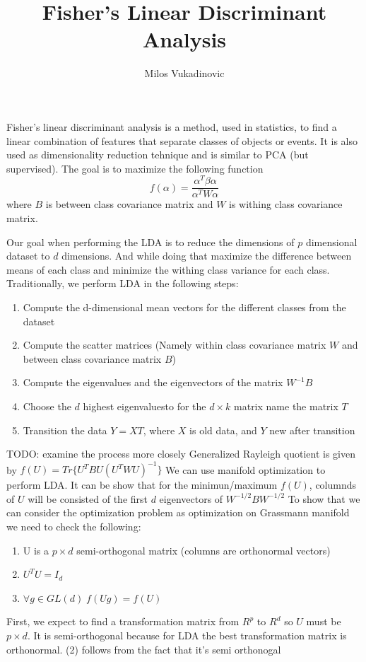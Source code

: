 \documentclass[11pt,a4paper]{report}
\author{Milos Vukadinovic}
\title{Fisher's Linear Discriminant Analysis}
\begin{document}
\maketitle

\begin{defn}
Fisher's linear discriminant analysis is a method, used in statistics, to find a linear combination of features that separate classes of objects or events.
It is also used as dimensionality reduction tehnique and is similar to PCA (but supervised). The goal is to maximize the following function
$$ f(\alpha) = \frac{\alpha^T  \beta \alpha}{\alpha^T W \alpha}$$
where $B$ is between class covariance matrix and $W$ is withing class covariance matrix.
\end{defn}
Our goal when performing the LDA is to reduce the dimensions of $p$ dimensional dataset to $d$ dimensions.
And while doing that maximize the difference between means of each class and minimize the withing class variance for each class.
Traditionally, we perform LDA in the following steps:
\begin{enumerate}
    \item Compute the d-dimensional mean vectors for the different classes from the dataset
    \item Compute the scatter matrices (Namely within class covariance matrix $W$ and between class covariance matrix $B$)
    \item Compute the eigenvalues and the eigenvectors of the matrix $W^{-1} B$
    \item Choose the $d$ highest eigenvaluesto for the $d \times k$ matrix name the matrix $T$
    \item Transition the data $Y = X T$, where $X$ is old data, and $Y$ new after transition
\end{enumerate}
TODO: examine the process more closely
\newline
Generalized Rayleigh quotient is given by $ f(U) = Tr \{ U^T B U (U^T W U)^{-1} \}$
We can use manifold optimization to perform LDA. 
It can be show that for the minimun/maximum $f(U)$, columnds of $U$ will be consisted of the first $d$ eigenvectors of $W^{-1/2} B W^{-1/2}$
\newline
To show that we can consider the optimization problem 
as optimization on Grassmann manifold we need to check the following:
\begin{enumerate}
    \item U is a $p \times d$ semi-orthogonal matrix (columns are orthonormal vectors)
    \item $U^T U = I_d$
    \item $\forall g \in GL(d) \; f(Ug) = f(U) $
\end{enumerate}
First, we expect to find a transformation matrix from $R^p$ to $R^d$ so $U$ must be $p \times d$.
It is semi-orthogonal because for LDA the best transformation matrix is orthonormal.
(2) follows from the fact that it's semi orthonogal
\end{document}
